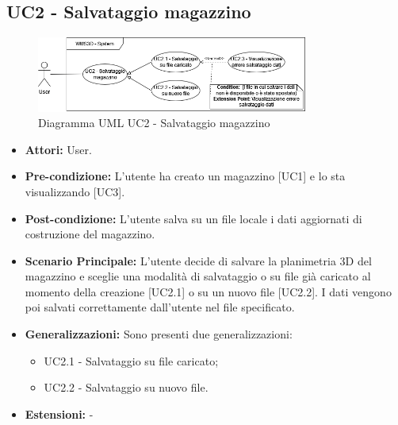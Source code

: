 \subsection{UC2 - Salvataggio magazzino}
\begin{figure}[H]
  \centering
  \includegraphics[width=0.8\textwidth]{UC_diagrams_1-10/UC2_sys.drawio.png}
   \caption{Diagramma UML UC2 - Salvataggio magazzino}
\end{figure}
\begin{itemize}
    \item \textbf{Attori:} User.
    \item \textbf{Pre-condizione:}  L'utente ha creato un magazzino [UC1] e lo sta visualizzando [UC3].
    \item \textbf{Post-condizione:} L'utente salva su un file locale i dati aggiornati di costruzione del magazzino.
    \item \textbf{Scenario Principale:}  L'utente decide di salvare la planimetria 3D del magazzino e sceglie una modalità di salvataggio o su file già caricato al momento della creazione [UC2.1] o su un nuovo file [UC2.2]. I dati vengono poi salvati correttamente dall'utente nel file specificato.
    \item \textbf{Generalizzazioni:} Sono presenti due generalizzazioni:
    \begin{itemize}
        \item UC2.1 - Salvataggio su file caricato;
        \item UC2.2 - Salvataggio su nuovo file.
    \end{itemize}
    \item \textbf{Estensioni:} -
\end{itemize}


